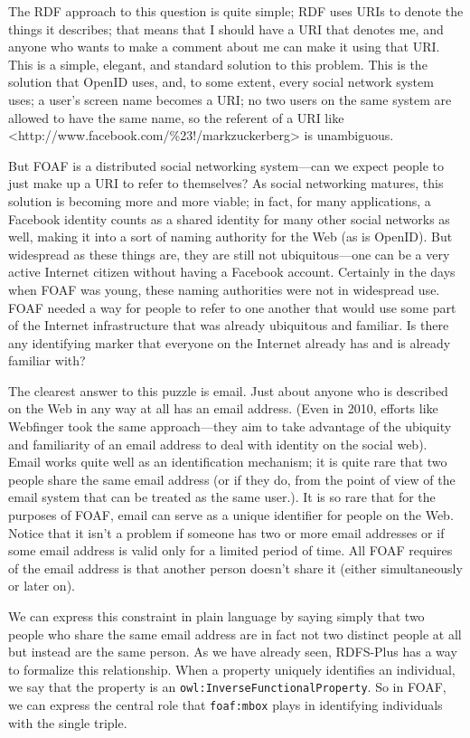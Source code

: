The RDF approach to this question is quite simple; RDF uses URIs to
denote the things it describes; that means that I should have a URI that
denotes me, and anyone who wants to make a comment about me can make it
using that URI. This is a simple, elegant, and standard solution to this
problem. This is the solution that OpenID uses, and, to some extent,
every social network system uses; a user's screen name becomes a URI; no
two users on the same system are allowed to have the same name, so the
referent of a URI like
\textless{}http://www.facebook.com/\%23!/markzuckerberg\textgreater{}
is unambiguous.

But FOAF is a distributed social networking system---can we expect
people to just make up a URI to refer to themselves? As social
networking matures, this solution is becoming more and more viable; in
fact, for many applications, a Facebook identity counts as a shared
identity for many other social networks as well, making it into a sort
of naming authority for the Web (as is OpenID). But widespread as these
things are, they are still not ubiquitous---one can be a very active
Internet citizen without having a Facebook account. Certainly in the
days when FOAF was young, these naming authorities were not in
widespread use. FOAF needed a way for people to refer to one another
that would use some part of the Internet infrastructure that was already
ubiquitous and familiar. Is there any identifying marker that everyone
on the Internet already has and is already familiar with?

The clearest answer to this puzzle is email. Just about anyone who is
described on the Web in any way at all has an email address. (Even in
2010, efforts like Webfinger took the same approach---they aim to take
advantage of the ubiquity and familiarity of an email address to deal
with identity on the social web). Email works quite well as an
identification mechanism; it is quite rare that two people share the
same email address (or if they do, from the point of view of the email system that can be treated as the same user.). 
It is so rare that for the purposes of FOAF, email
can serve as a unique identifier for people on the Web. Notice that it
isn't a problem if someone has two or more email addresses or if some
email address is valid only for a limited period of time. All FOAF
requires of the email address is that another person doesn't share it
(either simultaneously or later on).

We can express this constraint in plain language by saying simply that
two people who share the same email address are in fact not two distinct
people at all but instead are the same person. As we have already seen,
RDFS-Plus has a way to formalize this relationship. When a property
uniquely identifies an individual, we say that the property is an
\texttt{owl:InverseFunctionalProperty}. So in FOAF, we can express the central
role that \texttt{foaf:mbox} plays in identifying individuals with the single
triple.

